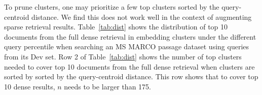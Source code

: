 
To prune clusters, one may prioritize a few top clusters sorted by the query-centroid distance.
We find this does not work well in the context of augmenting sparse retrieval results.  
Table~\ref{tab:dist} shows the distribution of top 10 documents from the full dense retrieval  
in embedding clusters under the different query percentile when searching an MS MARCO passage dataset using queries from its  Dev set. 
Row 2 of Table~\ref{tab:dist} shows the number of top clusters needed to cover  top 10 
documents from the full dense retrieval  when clusters are sorted by sorted by  the query-centroid distance.
This row shows that to cover top 10 dense results, $n$ needs  to be larger than 175.
\begin{table}[h]
 \vspace*{-1mm}
	\centering
	\caption{ Distribution of  top 10 dense results in sorted clusters 
}
 \vspace*{-5mm}
	\label{tab:dist}
\end{table}


